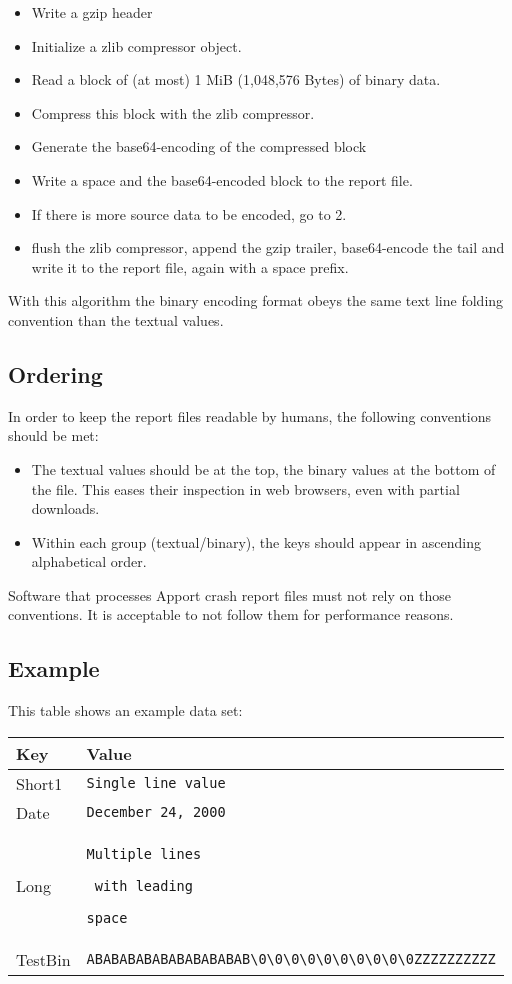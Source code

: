 \documentclass[DIV12,halfparskip]{scrartcl}
\begin{document}
\begin{itemize}
    \item Write a gzip header
    \item Initialize a zlib compressor object.
    \item Read a block of (at most) 1 MiB (1,048,576 Bytes) of binary data.
    \item Compress this block with the zlib compressor.
    \item Generate the base64-encoding of the compressed block
    \item Write a space and the base64-encoded block to the report file.
    \item If there is more source data to be encoded, go to 2.
    \item flush the zlib compressor, append the gzip trailer, base64-encode the
    tail and write it to the report file, again with a space prefix.
\end{itemize}

With this algorithm the binary encoding format obeys the same text line folding
convention than the textual values.

\subsection{Ordering}

In order to keep the report files readable by humans, the following conventions
should be met:

\begin{itemize}
    \item The textual values should be at the top, the binary values at the
    bottom of the file. This eases their inspection in web browsers, even with
    partial downloads.
    \item Within each group (textual/binary), the keys should appear in
    ascending alphabetical order.
\end{itemize}

Software that processes Apport crash report files must not rely on those
conventions. It is acceptable to not follow them for performance reasons.

\subsection{Example}

This table shows an example data set:

\begin{tabular}{lp{10cm}}\toprule
\textbf{Key} & \textbf{Value}\\
\midrule
Short1 & \verb!Single line value!\\
Date & \verb!December 24, 2000!\\
Long & \verb!Multiple lines!\par\verb! with leading!\par\verb!space!\\
TestBin & \verb!ABABABABABABABABABAB\0\0\0\0\0\0\0\0\0\0ZZZZZZZZZZ!\\
\bottomrule
\end{tabular}
\end{document}
